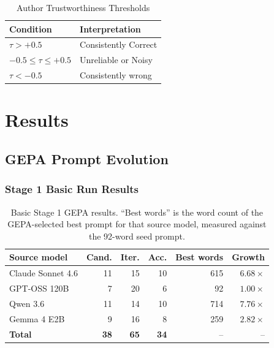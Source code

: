 \documentclass[sigconf,screen]{acmart}
\renewcommand{\arraystretch}{1.05}
\begin{document}
\begin{table}[t]
    \centering
    \small
    \setlength{\tabcolsep}{8pt}
    \renewcommand{\arraystretch}{1.15}
    \begin{tabular}{ll}
        \hline
        \textbf{Condition} & \textbf{Interpretation} \\
        \hline
        $\tau > +0.5$                    & Consistently Correct \\
        $-0.5 \leq \tau \leq +0.5$      & Unreliable or Noisy \\
        $\tau < -0.5$                    & Consistently wrong\\
        \hline
    \end{tabular}
    \caption{Author Trustworthiness Thresholds}
    \label{tab:thresholds}
\end{table}

\section{Results}
 
\subsection{GEPA Prompt Evolution}

\subsubsection{Stage 1 Basic Run Results}

\begin{table}[t]
    \centering
    \small
    \setlength{\tabcolsep}{3pt}
    \renewcommand{\arraystretch}{1.1}
    \begin{tabular}{lrrrrr}
        \hline
        \textbf{Source model} & \textbf{Cand.} & \textbf{Iter.} &
        \textbf{Acc.} & \textbf{Best words} & \textbf{Growth} \\
        \hline
        Claude Sonnet 4.6 & 11 & 15 & 10 & 615 & $6.68\times$ \\
        GPT-OSS 120B & 7 & 20 & 6 & 92 & $1.00\times$ \\
        Qwen 3.6 & 11 & 14 & 10 & 714 & $7.76\times$ \\
        Gemma 4 E2B & 9 & 16 & 8 & 259 & $2.82\times$ \\
        \hline
        \textbf{Total} & \textbf{38} & \textbf{65} & \textbf{34} & -- & -- \\
        \hline
    \end{tabular}
    \caption{Basic Stage 1 GEPA results. ``Best words'' is the word count of
    the GEPA-selected best prompt for that source model, measured against the
    92-word seed prompt.}
    \label{tab:stage1_basic_gepa_results}
\end{table}
\end{document}
